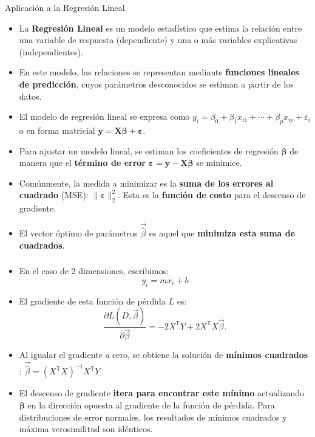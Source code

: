 \documentclass{beamer}
\begin{document}
\begin{frame}{Aplicación a la Regresión Lineal}
    \begin{itemize}
        \item La \textbf{Regresión Lineal} es un modelo estadístico que estima la relación entre una variable de respuesta (dependiente) y una o más variables explicativas (independientes).
        \item En este modelo, las relaciones se representan mediante \textbf{funciones lineales de predicción}, cuyos parámetros desconocidos se estiman a partir de los datos.
        \item El modelo de regresión lineal se expresa como $y_{i}=\beta _{0}+\beta _{1}x_{i1}+\cdots +\beta _{p}x_{ip}+\varepsilon _{i}$ o en forma matricial $\mathbf{y}=\mathbf{X}\boldsymbol{\beta}+\boldsymbol{\varepsilon}$.
        \item Para ajustar un modelo lineal, se estiman los coeficientes de regresión $\boldsymbol{\beta}$ de manera que el \textbf{término de error} $\boldsymbol{\varepsilon} = \mathbf{y} - \mathbf{X}\boldsymbol{\beta}$ se minimice.
        \item Comúnmente, la medida a minimizar es la \textbf{suma de los errores al cuadrado} (MSE): $\|\boldsymbol{\varepsilon}\|_{2}^{2}$. Esta es la \textbf{función de costo} para el descenso de gradiente.
        \item El vector óptimo de parámetros $\vec{\hat{\beta}}$ es aquel que \textbf{minimiza esta suma de cuadrados}.
    \end{itemize}
\end{frame}

\begin{frame}
    \frametitle{}
    \begin{itemize}
\item En el caso de 2 dimensiones, escribimos:
    $$y_i = m x_i + b$$
        \item El gradiente de esta función de pérdida $L$ es: $$\frac{\partial L(D,{\vec{\beta}})}{\partial {\vec{\beta}}} = -2X^{\textsf{T}}Y+2X^{\textsf{T}}X{\vec{\beta}}.$$
        \item Al igualar el gradiente a cero, se obtiene la solución de \textbf{mínimos cuadrados }: $\vec{\hat{\beta}} = \left(X^{\textsf{T}}X\right)^{-1}X^{\textsf{T}}Y$.
        \item El descenso de gradiente \textbf{itera para encontrar este mínimo} actualizando $\boldsymbol{\beta}$ en la dirección opuesta al gradiente de la función de pérdida. Para distribuciones de error normales, los resultados de mínimos cuadrados y máxima verosimilitud son idénticos.
    \end{itemize}
        \end{frame}
\end{document}
